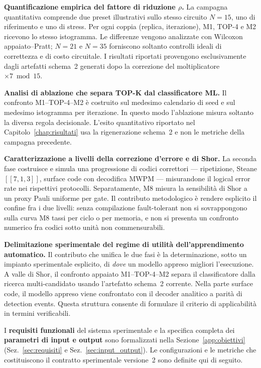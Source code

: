 \begin{onehalfspace}
\textbf{Quantificazione empirica del fattore di riduzione $\rho$.} La campagna quantitativa comprende due preset illustrativi sullo stesso circuito $N=15$, uno di riferimento e uno di stress. Per ogni coppia (replica, iterazione), M1, TOP-4 e M2 ricevono lo stesso istogramma. Le differenze vengono analizzate con Wilcoxon appaiato--Pratt; $N=21$ e $N=35$ forniscono soltanto controlli ideali di correttezza e di costo circuitale. I risultati riportati provengono esclusivamente dagli artefatti schema~2 generati dopo la correzione del moltiplicatore $\times7\bmod15$.

\textbf{Analisi di ablazione che separa TOP-K dal classificatore ML.} Il confronto M1--TOP-4--M2 è costruito sul medesimo calendario di seed e sul medesimo istogramma per iterazione. In questo modo l'ablazione misura soltanto la diversa regola decisionale. L'esito quantitativo riportato nel Capitolo~\ref{chap:risultati} usa la rigenerazione schema~2 e non le metriche della campagna precedente.

\textbf{Caratterizzazione a livelli della correzione d'errore e di Shor.} La seconda fase costruisce e simula una progressione di codici correttori --- ripetizione, Steane $[[7,1,3]]$, surface code con decodifica \ac{MWPM} --- misurandone il logical error rate nei rispettivi protocolli. Separatamente, M8 misura la sensibilità di Shor a un proxy Pauli uniforme per gate. Il contributo metodologico è rendere esplicito il confine fra i due livelli: senza compilazione fault-tolerant non si sovrappongono sulla curva M8 tassi per ciclo o per memoria, e non si presenta un confronto numerico fra codici sotto unità non commensurabili.

\textbf{Delimitazione sperimentale del regime di utilità dell'apprendimento automatico.} Il contributo che unifica le due fasi è la determinazione, sotto un impianto sperimentale esplicito, di \emph{dove} un modello appreso migliori l'esecuzione. A valle di Shor, il confronto appaiato M1--TOP-4--M2 separa il classificatore dalla ricerca multi-candidato usando l'artefatto schema~2 corrente. Nella parte surface code, il modello appreso viene confrontato con il decoder analitico a parità di detection events. Questa struttura consente di formulare il criterio di applicabilità in termini verificabili.

I \textbf{requisiti funzionali} del sistema sperimentale e la specifica completa dei \textbf{parametri di input e output} sono formalizzati nella Sezione~\ref{app:obiettivi} (Sez.~\ref{sec:requisiti} e Sez.~\ref{sec:input_output}). Le configurazioni e le metriche che costituiscono il contratto sperimentale versione~2 sono definite qui di seguito.

\end{onehalfspace}
